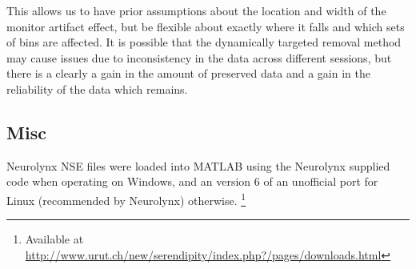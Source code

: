 This allows us to have prior assumptions about the location and width of the monitor artifact effect, but be flexible about exactly where it falls and which sets of bins are affected.
It is possible that the dynamically targeted removal method may cause issues due to inconsistency in the data across different sessions, but there is a clearly a gain in the amount of preserved data and a gain in the reliability of the data which remains.


\subsection{Misc}

Neurolynx NSE files were loaded into MATLAB using the Neurolynx supplied code when operating on Windows, and an version 6 of an unofficial port for Linux (recommended by Neurolynx) otherwise.%
\footnote{Available at
\\ \url{http://www.urut.ch/new/serendipity/index.php?/pages/downloads.html}}
